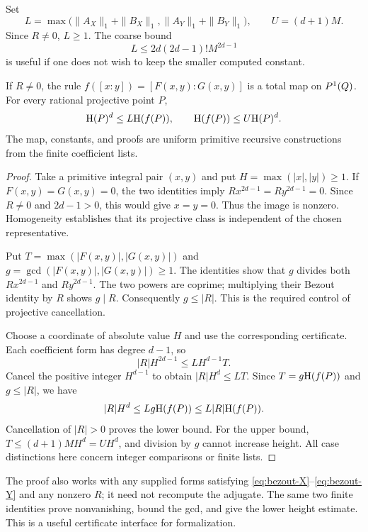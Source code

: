 Set
\[
 L=\max\bigl(\|A_X\|_1+\|B_X\|_1,
             \|A_Y\|_1+\|B_Y\|_1\bigr),\qquad U=(d+1)M.
\]
Since $R\ne0$, $L\ge1$. The coarse bound
\begin{equation}\label{eq:coarse-L}
                L\le 2d(2d-1)!M^{2d-1}
\end{equation}
is useful if one does not wish to keep the smaller computed constant.

\begin{theorem}
\label{thm:height-map}
If $R\ne0$, the rule $f([x:y])=[F(x,y):G(x,y)]$ is a total map on
$P^1(Q)$. For every rational projective point $P$,
\begin{equation}\label{eq:height-map}
              \mathrm H(P)^d\le L\mathrm H(f(P)),\qquad
              \mathrm H(f(P))\le U\mathrm H(P)^d.
\end{equation}
The map, constants, and proofs are uniform primitive recursive constructions
from the finite coefficient lists.
\end{theorem}
\begin{proof}
Take a primitive integral pair $(x,y)$ and put $H=\max(|x|,|y|)\ge1$.
If $F(x,y)=G(x,y)=0$, the two identities imply
$R x^{2d-1}=R y^{2d-1}=0$. Since $R\ne0$ and $2d-1>0$, this would give
$x=y=0$. Thus the image is nonzero. Homogeneity establishes that its
projective class is independent of the chosen representative.

Put $T=\max(|F(x,y)|,|G(x,y)|)$ and
$g=\gcd(|F(x,y)|,|G(x,y)|)\ge1$. The identities show that $g$ divides
both $R x^{2d-1}$ and $R y^{2d-1}$. The two powers are coprime; multiplying
their Bezout identity by $R$ shows $g\mid R$. Consequently $g\le|R|$.
This is the required control of projective cancellation.

Choose a coordinate of absolute value $H$ and use the corresponding
certificate. Each coefficient form has degree $d-1$, so
\[
 |R|H^{2d-1}\le L H^{d-1}T.
\]
Cancel the positive integer $H^{d-1}$ to obtain
$|R|H^d\le LT$. Since $T=g\mathrm H(f(P))$ and $g\le|R|$, we have
\[
 |R|H^d\le Lg\mathrm H(f(P))\le L|R|\mathrm H(f(P)).
\]
Cancellation of $|R|>0$ proves the lower bound. For the upper bound,
$T\le(d+1)MH^d=UH^d$, and division by $g$ cannot increase height.
All case distinctions here concern integer comparisons or finite lists.
\end{proof}

The proof also works with any supplied forms satisfying
\eqref{eq:bezout-X}--\eqref{eq:bezout-Y} and any nonzero $R$; it need not
recompute the adjugate. The same two finite identities prove nonvanishing,
bound the gcd, and give the lower height estimate. This is a useful
certificate interface for formalization.

